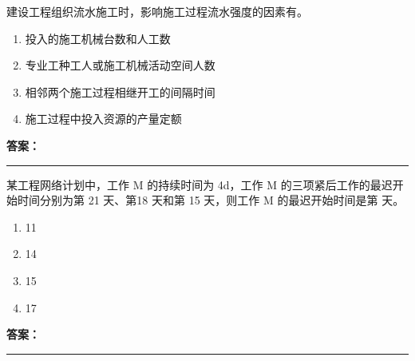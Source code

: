 \documentclass[UTF8,fontset=fandol,11pt]{ctexart}
\newcommand{\answerline}{\textcolor{answerred}{\rule{2.4cm}{0.7pt}}}
\begin{document}
\begin{quizbox}[title={乱序第 210 题｜第十章流水施工原理}]

建设工程组织流水施工时，影响施工过程流水强度的因素有。\\

\begin{enumerate}[label=\Alph*.]

\item 投入的施工机械台数和人工数

\item 专业工种工人或施工机械活动空间人数

\item 相邻两个施工过程相继开工的间隔时间

\item 施工过程中投入资源的产量定额

\end{enumerate}

\textbf{\textcolor{answerred}{答案：}} \answerline

\end{quizbox}

\vspace{0.2em}

\begin{quizbox}[title={乱序第 211 题｜第十一章网络计划技术}]

某工程网络计划中，工作 M 的持续时间为 4d，工作 M 的三项紧后工作的最迟开始时间分别为第 21 天、第18 天和第 15 天，则工作 M 的最迟开始时间是第 天。\\

\begin{enumerate}[label=\Alph*.]

\item 11

\item 14

\item 15

\item 17

\end{enumerate}

\textbf{\textcolor{answerred}{答案：}} \answerline

\end{quizbox}

\vspace{0.2em}
\end{document}
